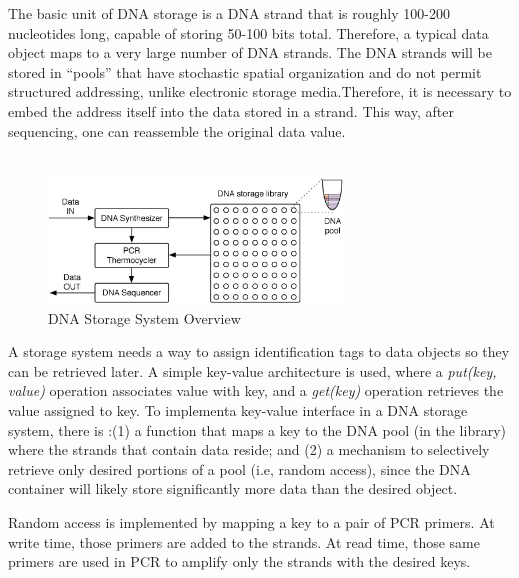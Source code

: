 \documentclass[a4paper]{article}
\begin{document}
The basic unit of DNA storage is a DNA strand that is roughly 100-200 nucleotides long, capable of storing 50-100
bits total. Therefore, a typical data object maps to a very large number of DNA strands. The DNA strands will be stored in
“pools” that have stochastic spatial organization and do not permit structured addressing, unlike electronic storage media.Therefore, it is necessary to embed the address itself into the data stored in a strand. This way, after sequencing, one can reassemble the original data value.
\\ \\
\begin{figure}
    \centering
      \includegraphics[width=0.7\textwidth]{system-overview}
      \caption{DNA Storage System Overview}
      \label{fig:system-overview}
  \end{figure}
A storage system needs a way to assign identification tags to data objects so they can be retrieved later. A simple key-value architecture is used, where a \textit{put(key, value)} operation associates value with key, and a \textit{get(key)} operation retrieves the value assigned to key. To implementa key-value interface in a DNA storage system, there is :(1) a function that maps a key to the DNA pool (in the library) where the strands that contain data reside; and (2) a mechanism to selectively retrieve only desired portions of a pool (i.e, random access), since the DNA container will likely store significantly more data than the desired object.

Random access is implemented by mapping a key to a pair of PCR primers. At write time, those primers are added to the strands. At read time, those same primers are used in PCR to amplify only the strands with the desired keys. 
\end{document}
